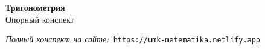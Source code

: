 \documentclass{umk-matematika}
\begin{document}
\begin{center}
{\Large\bfseries Тригонометрия}
\\[0.3cm]{\large Опорный конспект}
\end{center}
\vspace{0.5cm}

\begin{center}
\textit{Полный конспект на сайте:}\
\texttt{https://umk-matematika.netlify.app}
\end{center}
\end{document}
